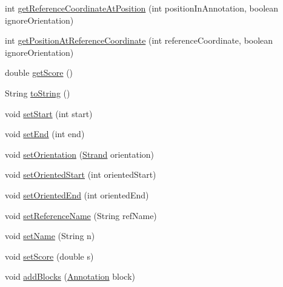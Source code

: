\begin{DoxyCompactItemize}
\item 
int \hyperlink{classumms_1_1core_1_1annotation_1_1_basic_annotation_a97c73f4d65360b36306293e770c16f2a}{get\+Reference\+Coordinate\+At\+Position} (int position\+In\+Annotation, boolean ignore\+Orientation)
\item 
int \hyperlink{classumms_1_1core_1_1annotation_1_1_basic_annotation_ae69c53e957652448229c91fc0e56fa73}{get\+Position\+At\+Reference\+Coordinate} (int reference\+Coordinate, boolean ignore\+Orientation)
\item 
double \hyperlink{classumms_1_1core_1_1annotation_1_1_basic_annotation_a9701cbbb370ff99a7436068616bf7f27}{get\+Score} ()
\item 
String \hyperlink{classumms_1_1core_1_1annotation_1_1_basic_annotation_ac54e4e381fbb0b97ff9c6a4958ecba2a}{to\+String} ()
\item 
void \hyperlink{classumms_1_1core_1_1annotation_1_1_basic_annotation_a3c5672991e6679950db460e22d727740}{set\+Start} (int start)
\item 
void \hyperlink{classumms_1_1core_1_1annotation_1_1_basic_annotation_a8abb166f1057b8e7cd4230b4d6b91235}{set\+End} (int end)
\item 
void \hyperlink{classumms_1_1core_1_1annotation_1_1_basic_annotation_a2956f388c13ae52dda924547002a5393}{set\+Orientation} (\hyperlink{enumumms_1_1core_1_1annotation_1_1_annotation_1_1_strand}{Strand} orientation)
\item 
void \hyperlink{classumms_1_1core_1_1annotation_1_1_basic_annotation_adb91d1844a2a1543aa854d9c43e5b937}{set\+Oriented\+Start} (int oriented\+Start)
\item 
void \hyperlink{classumms_1_1core_1_1annotation_1_1_basic_annotation_a350aa437c56b6e7cc3230df3be7097b4}{set\+Oriented\+End} (int oriented\+End)
\item 
void \hyperlink{classumms_1_1core_1_1annotation_1_1_basic_annotation_aa116c039168d25b2c9c2f767f2bc44e4}{set\+Reference\+Name} (String ref\+Name)
\item 
void \hyperlink{classumms_1_1core_1_1annotation_1_1_basic_annotation_a9cde990314fec1ff189b59542cc11809}{set\+Name} (String n)
\item 
void \hyperlink{classumms_1_1core_1_1annotation_1_1_basic_annotation_ad04c091013feb60b8df504c4feef4cc4}{set\+Score} (double s)
\item 
void \hyperlink{classumms_1_1core_1_1annotation_1_1_basic_annotation_a85006232b0a0fa873bc5d3beaaf4d3c1}{add\+Blocks} (\hyperlink{interfaceumms_1_1core_1_1annotation_1_1_annotation}{Annotation} block)

\end{DoxyCompactItemize}

